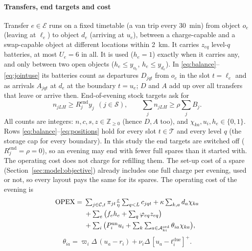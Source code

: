 \paragraph*{Transfers, end targets and cost}
Transfer $e\in\mathcal E$ runs on a fixed timetable (a van trip every 30~min) from object $o_e$ (leaving at $\ell_e$) to object $d_e$ (arriving at $u_e$), between a charge-capable and a swap-capable object at different locations within 2~km. It carries $z_{eq}$ level-$q$ batteries, at most $U_e=6$ in all. It is used ($h_e=1$) exactly when it carries any, and only between two open objects ($h_e\le y_{o_e}$, $h_e\le y_{d_e}$). In \eqref{eq:balance}--\eqref{eq:jointuse} its batteries count as departures $D_{jqt}$ from $o_e$ in the slot $t=\ell_e$ and as arrivals $A_{jqt}$ at $d_e$ at the boundary $t=u_e$; $D$ and $A$ add up over all transfers that leave or arrive then. End-of-evening stock targets ask for
\begin{equation}\label{eq:endtargets}
  n_{jLH}\ge R^{\mathrm{end}}_jy_j\ \ (j\in\mathcal S),\qquad \textstyle\sum_jn_{jLH}\ge\rho\sum_jB_j.
\end{equation}
All counts are integers: $n,c,s,z\in\mathbb Z_{\ge0}$ (hence $D,A$ too), and $\chi_{ka},u_i,h_e\in\{0,1\}$. Rows \eqref{eq:balance}--\eqref{eq:positions} hold for every slot $t\in\mathcal T$ and every level $q$ (the storage cap for every boundary). In this study the end targets are switched off ($R^{\mathrm{end}}_j=\rho=0$), so an evening may end with fewer full spares than it started with. The operating cost does not charge for refilling them. The set-up cost of a spare (Section~\ref{sec:model:objective}) already includes one full charge per evening, used or not, so every layout pays the same for its spares. The operating cost of the evening is
\begin{equation}\label{eq:opex}
  \begin{split}
  \mathrm{OPEX}={}&\textstyle\sum_{j\in\mathcal C,t}\pi_{jt}\frac{\varepsilon}{\eta}\sum_{q<L}c_{jqt}+\kappa\sum_{k,a}d_a\chi_{ka}\\
  &\textstyle+\sum_e\big(f_eh_e+\sum_q\varphi_{eq}z_{eq}\big)\\
  &\textstyle+\sum_i\big(P^{\mathrm{un}}_iu_i+\sum_k\sum_{a\in\mathcal A^{\mathrm{ord}}_{ki}}\theta_{ia}\chi_{ka}\big),
  \end{split}
\end{equation}
\begin{equation}\label{eq:orderprice}
  \theta_{ia}=\varpi_i\Delta\,(u_a-r_i)+\nu_i\Delta\,[u_a-t^{\mathrm{due}}_i]^+ .
\end{equation}
